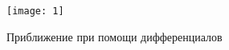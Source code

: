 \begin{figure} 
    \centering
    \texttt{[image: 1]}
    \caption{\label{fig:diffGeom} Приближение при помощи дифференциалов}
\end{figure}